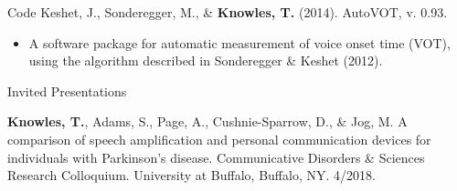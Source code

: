 \documentclass{resume} %
\begin{document}

\begin{rSection}{Code}
	Keshet, J., Sonderegger, M., \& {\bf Knowles, T.} (2014). AutoVOT, v. 0.93.
	\begin{itemize}
			\renewcommand\labelitemi{$\cdot$}
		\item A software package for automatic measurement of voice onset time (VOT), using the algorithm described in Sonderegger \& Keshet (2012).
	\end{itemize}
\end{rSection}


\begin{rSection}{Invited Presentations}

	{\bf Knowles, T.}, Adams, S., Page, A., Cushnie-Sparrow, D., \& Jog, M. A comparison of speech amplification and personal communication devices for individuals with Parkinson's disease. Communicative Disorders \& Sciences Research Colloquium. University at Buffalo, Buffalo, NY. 4/2018.

\end{rSection}

\end{document}
